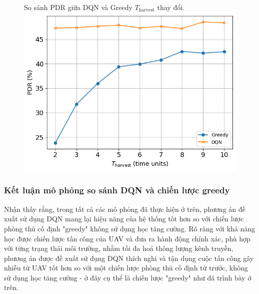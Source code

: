 \documentclass{uetgraduation}
\begin{document}
\begin{figure}{So sánh PDR giữa DQN và Greedy $T_\text{harvest}$ thay đổi.}
    \centering
    \includegraphics[scale=0.8]{t_harvest_pdr.png}
    \label{fig:t_pdr}
\end{figure}

\subsubsection{Kết luận mô phỏng so sánh DQN và chiến lược greedy}
Nhận thấy rằng, trong tất cả các mô phỏng đã thực hiện ở trên, phương án đề xuất sử dụng DQN mang lại hiệu năng của hệ thống tốt hơn so với chiến lược phòng thủ cố định "greedy"
không sử dụng học tăng cường. Rõ ràng với khả năng học được chiến lược tấn công của UAV và đưa ra hành động chính xác, phù hợp với từng trạng thái môi trường, nhằm tối đa hoá thông
lượng kênh truyền, phương án được đề
xuất sử dụng DQN thích nghi và tận dụng cuộc tấn công gây nhiễu từ UAV tốt hơn so với một chiến lược phòng thủ cố định từ trước, không sử dụng học tăng cường - ở đây cụ thể là chiến lược "greedy"
như đã trình bày ở trên.
\end{document}
